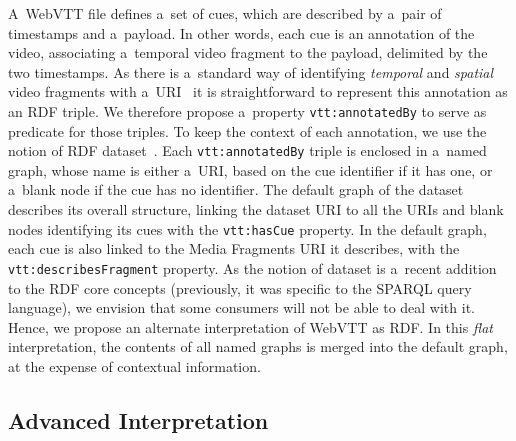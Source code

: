 \documentclass{sig-alternate}
\newcommand{\vtt}[1]{\texttt{vtt:#1}}
\begin{document}
A~WebVTT file defines a~set of cues,
which are described by a~pair of timestamps and a~payload.
In other words, each cue is an annotation of the video,
associating a~temporal video fragment to the payload,
delimited by the two timestamps.
As there is a~standard way of identifying \emph{temporal}
and \emph{spatial} video fragments
with a~URI~\cite{troncy2012mediafragments}
it is straightforward to represent this annotation as an RDF triple.
We therefore propose a~property \vtt{annotatedBy}
to serve as predicate for those triples.
To keep the context of each annotation,
we use the notion of RDF dataset~\cite{cyganiak2014rdf11concepts}.
Each \vtt{annotatedBy} triple is enclosed in a~named graph,
whose name is either a~URI, based on the cue identifier if it has one,
or a~blank node if the cue has no identifier.
The default graph of the dataset describes its overall structure,
linking the dataset URI to all the URIs and blank nodes identifying its cues
with the \vtt{hasCue} property.
In the default graph, each cue is also linked to
the Media Fragments URI it describes,
with the \vtt{describesFragment} property. 
As the notion of dataset is a~recent addition to the RDF core concepts
(previously, it was specific to the SPARQL query language),
we envision that some consumers will not be able to deal with it.
Hence, we propose an alternate interpretation of WebVTT as RDF.
In this \emph{flat} interpretation,
the contents of all named graphs is merged into the default graph,
at the expense of contextual information.

\subsection{Advanced Interpretation}
\end{document}
